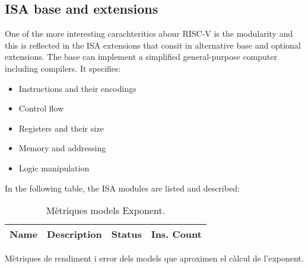 \subsection{ISA base and extensions} 
One of the more interesting carachteritics abour RISC-V is the modularity and this is reflected in the ISA extensions that consit in alternative base  and optional extensions. The base can implement a simplified general-purpose computer including compilers. It specifies: 

\begin{itemize}
	\item Instructions and their encodings
	\item Control flow
	\item Registers and their size
	\item Memory and addressing
	\item Logic manipulation
\end{itemize}

In the following table, the ISA modules are listed and described:

\begin{table}[H]
\centering
\begin{tabular}{|c|c|c|c|}
\hline
\textbf{Name} & \textbf{Description} & \textbf{Status}  & \textbf{Ins. Count}  \\ \hline

\end{tabular}
\caption{Mètriques models Exponent.} Mètriques de rendiment i error dels models que aproximen el càlcul de l'exponent.
\end{table}


